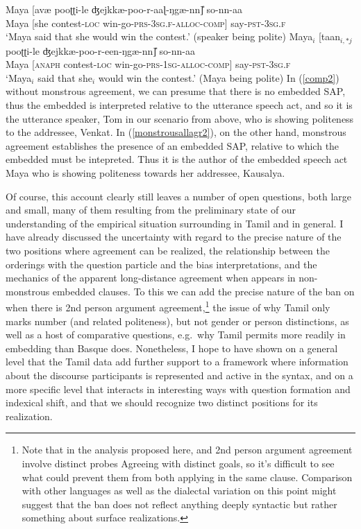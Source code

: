 \documentclass[output=paper, modfonts, nonflat]{langsci/langscibook}
\begin{document}
\ea\label{monnomon}
 \ea\label{comp2}\gll Maya [avæ{} pooʈʈi-le ʤejkkæ-poo-r-aaɭ-ŋgæ-nn\U] so-nn-aa\\  
 Maya [she contest-\textsc{loc}{} win-go-\textsc{prs}-3\textsc{sg.f}-\textsc{alloc}-\textsc{comp}] say-\textsc{pst}-3\textsc{sg.f}\\ 
 \glt `Maya said that she would win the contest.' (speaker being polite)
 \ex\label{monstrousallagr2}\gll Maya$_i$ [taan$_{i,*j}$ pooʈʈi-le ʤejkkæ-poo-r-een-ŋgæ-nn\U] so-nn-aa\\  
 Maya [\textsc{anaph} contest-\textsc{loc}{} win-go-\textsc{prs}-1\textsc{sg}-\textsc{alloc}-\textsc{comp}] say-\textsc{pst}-3\textsc{sg.f}\\
 \glt `Maya$_i$ said that she$_i$ would win the contest.' (Maya being polite)
 \z
\z
%
In (\ref{comp2}) without monstrous agreement, we can presume that
there is no embedded SAP, thus the embedded \allagr{} is interpreted
relative to the utterance speech act, and so it is the utterance
speaker, Tom in our scenario from above, who is showing politeness to
the addressee, Venkat. In (\ref{monstrousallagr2}), on the other hand,
monstrous agreement establishes the presence of an embedded SAP,
relative to which the embedded \allagr{} must be intepreted. Thus it
is the author of the embedded speech act Maya who is showing
politeness towards her addressee, Kausalya.

Of course, this account clearly still leaves a number of open
questions, both large and small, many of them resulting from the
preliminary state of our understanding of the empirical situation
surrounding \allagr{} in Tamil and in general. I have already
discussed the uncertainty with regard to the precise nature of the two
positions where agreement can be realized, the relationship between
the orderings with the question particle and the bias interpretations,
and the mechanics of the apparent long-distance agreement when
\allagr{} appears in non-monstrous embedded clauses. To this we can
add the precise nature of the ban on \allagr{} when there is 2nd
person argument agreement,\footnote{Note that in the analysis proposed
  here, \allagr{} and 2nd person argument agreement involve distinct
  probes Agreeing with distinct goals, so it's difficult to see what
  could prevent them from both applying in the same clause. Comparison
  with other languages as well as the dialectal variation on this
  point might suggest that the ban does not reflect anything deeply
  syntactic but rather something about surface realizations.} the
issue of why Tamil \allagr{} only marks number (and related
politeness), but not gender or person distinctions, as well as a host
of comparative questions, e.g.\ why Tamil permits \allagr{} more
readily in embedding than Basque does. Nonetheless, I hope to have
shown on a general level that the Tamil data add further support to a
framework where information about the discourse participants is
represented and active in the syntax, and on a more specific level
that \allagr{} interacts in interesting ways with question formation
and indexical shift, and that we should recognize two distinct
positions for its realization.
\newpage
\end{document}
